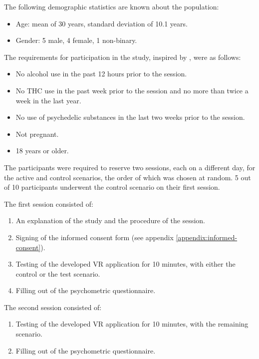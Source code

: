 The following demographic statistics are known about the population:
\begin{itemize}
    \setlength{\itemsep}{0pt}
    \setlength{\parskip}{0pt}
    \item Age: mean of 30 years, standard deviation of 10.1 years.
    \item Gender: 5 male, 4 female, 1 non-binary.
\end{itemize}

The requirements for participation in the study, inspired by \textcite{bartossek2021altered}, were as follows:
\begin{itemize}
    \setlength{\itemsep}{0pt}
    \setlength{\parskip}{0pt}
    \item No alcohol use in the past 12 hours prior to the session.
    \item No \acs{THC} use in the past week prior to the session and no more than twice a week in the last year.
    \item No use of psychedelic substances in the last two weeks prior to the session.
    \item Not pregnant.
    \item 18 years or older.
\end{itemize}

The participants were required to reserve two sessions, each on a different day, for the active and control scenarios, the order of which was chosen at random. 5 out of 10 participants underwent the control scenario on their first session.

The first session consisted of:
\begin{enumerate}
    \setlength{\itemsep}{0pt}
    \setlength{\parskip}{0pt}
    \item An explanation of the study and the procedure of the session.
    \item Signing of the informed consent form (see appendix \ref{appendix:informed-consent}).
    \item Testing of the developed VR application for 10 minutes, with either the control or the test scenario.
    \item Filling out of the psychometric questionnaire.
\end{enumerate}

The second session consisted of:
\begin{enumerate}
    \setlength{\itemsep}{0pt}
    \setlength{\parskip}{0pt}
    \item Testing of the developed VR application for 10 minutes, with the remaining scenario.
    \item Filling out of the psychometric questionnaire.
\end{enumerate}

